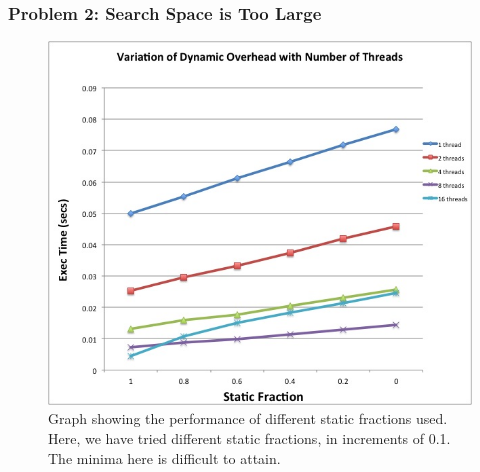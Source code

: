 \begin{frame}
\frametitle{Problem 2: Search Space is Too Large}
\begin{figure}
\includegraphics[scale=0.20]{./plots/vary-sf-for-diff-threads}
\caption{Graph showing the performance of different static fractions used. Here, we have tried different static
fractions, in increments of 0.1. The minima here is difficult to attain.}
\end{figure}
\end{frame}

